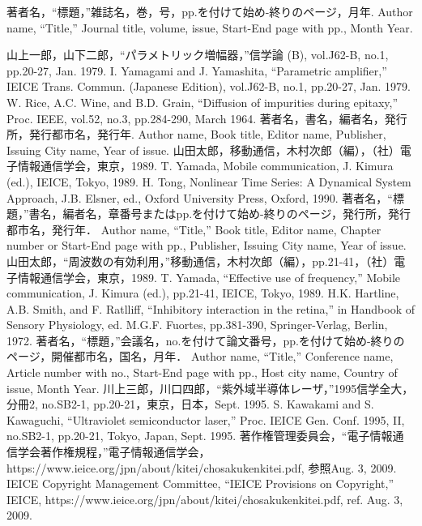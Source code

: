 \begin{thebibliography}{99}
   著者名，“標題，”雑誌名，巻，号，pp.を付けて始め-終りのページ，月年.
Author name, “Title,” Journal title, volume, issue, Start-End page with pp., Month Year.

   山上一郎，山下二郎，“パラメトリック増幅器，”信学論 (B), vol.J62-B, no.1, pp.20-27, Jan. 1979.
I. Yamagami and J. Yamashita, “Parametric amplifier,” IEICE Trans. Commun. (Japanese Edition), vol.J62-B, no.1, pp.20-27, Jan. 1979.
   W. Rice, A.C. Wine, and B.D. Grain, “Diffusion of impurities during epitaxy,” Proc. IEEE, vol.52, no.3, pp.284-290, March 1964.
   著者名，書名，編者名，発行所，発行都市名，発行年.
Author name, Book title, Editor name, Publisher, Issuing City name, Year of issue.
   山田太郎，移動通信，木村次郎（編），（社）電子情報通信学会，東京，1989.
T. Yamada, Mobile communication, J. Kimura (ed.), IEICE, Tokyo, 1989.
   H. Tong, Nonlinear Time Series: A Dynamical System Approach, J.B. Elsner, ed., Oxford University Press, Oxford, 1990.
   著者名，“標題，”書名，編者名，章番号またはpp.を付けて始め-終りのページ，発行所，発行都市名，発行年．
Author name, “Title,” Book title, Editor name, Chapter number or Start-End page with pp., Publisher, Issuing City name, Year of issue.
   山田太郎，“周波数の有効利用，”移動通信，木村次郎（編），pp.21-41，（社）電子情報通信学会，東京，1989.
T. Yamada, “Effective use of frequency,” Mobile communication, J. Kimura (ed.), pp.21-41, IEICE, Tokyo, 1989.
   H.K. Hartline, A.B. Smith, and F. Ratlliff, “Inhibitory interaction in the retina,” in Handbook of Sensory Physiology, ed. M.G.F. Fuortes, pp.381-390, Springer-Verlag, Berlin, 1972.
   著者名，“標題，”会議名，no.を付けて論文番号，pp.を付けて始め-終りのページ，開催都市名，国名，月年．
Author name, “Title,” Conference name, Article number with no., Start-End page with pp., Host city name, Country of issue, Month Year.
   川上三郎，川口四郎，“紫外域半導体レーザ，”1995信学全大，分冊2, no.SB2-1, pp.20-21，東京，日本，Sept. 1995.
S. Kawakami and S. Kawaguchi, “Ultraviolet semiconductor laser,” Proc. IEICE Gen. Conf. 1995, I\hspace{-1.2pt}I, no.SB2-1, pp.20-21, Tokyo, Japan, Sept. 1995.
   著作権管理委員会，“電子情報通信学会著作権規程，”電子情報通信学会，https://www.ieice.org/jpn/about/kitei/chosakukenkitei.pdf, 参照Aug. 3, 2009.
IEICE Copyright Management Committee, “IEICE Provisions on Copyright,” IEICE, https://www.ieice.org/jpn/about/kitei/chosakukenkitei.pdf, ref. Aug. 3, 2009.
\end{thebibliography}
